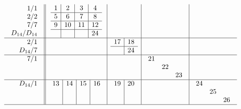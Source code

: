 \documentclass[12pt,a4paper]{amsart}
\begin{document}
\scriptsize {}
\begin{align*}
  \begin{array}{r||c|c|c|c}
    \begin{array}{r}
      1/1 \\ 2/2 \\ 7/7 \\ D_{14}/D_{14}
    \end{array}
    &
    \begin{array}{c|c|c|c}
1&2&3&4\\\hline
5&6&7&8\\\hline
9&10&11&12\\\hline
&&&24\\
    \end{array}
&&&\\\hline
    \begin{array}{r}
      2/1 \\ D_{14}/7
    \end{array}
&&
    \begin{array}{c|c}
      17&18\\\hline
      &24\\
    \end{array}
&&\\\hline
    \begin{array}{r}
      7/1 \\ \\ \\
    \end{array}
&
&
&
  \begin{array}{ccc}
21&&\\
&22&\\
&&23\\
  \end{array}
&\\\hline
    \begin{array}{r}
      D_{14}/1 \\  \\ \\
    \end{array}
&
    \begin{array}{c|c|c|c}
13&14&15&16\\
&&&\\
&&&\\
    \end{array}
&
    \begin{array}{c|c}
      19&20\\
      &\\
      &\\
    \end{array}
&
&
  \begin{array}{ccc}
24&&\\
&25&\\
&&26\\
  \end{array}
\\\hline
  \end{array}
\end{align*}
\end{document}
